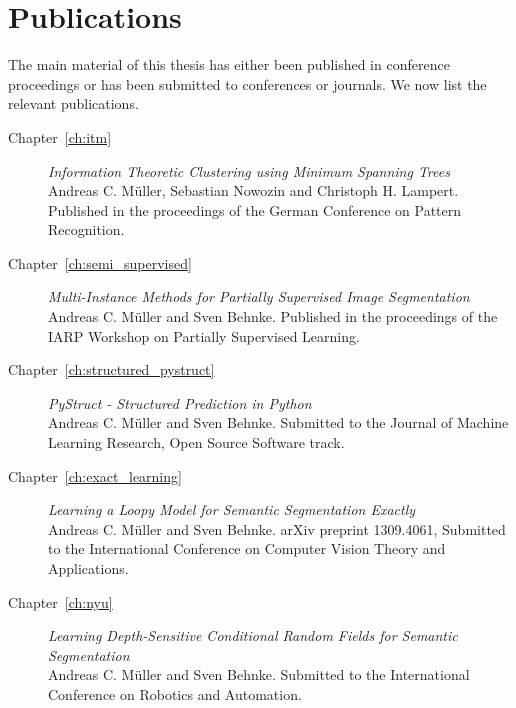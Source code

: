 \section{Publications}
The main material of this thesis has either been published in conference
proceedings or has been submitted to conferences or journals. We now list the
relevant publications.
\begin{description}
    \item[Chapter~\ref{ch:itm}]%
        \emph{Information Theoretic Clustering using Minimum Spanning Trees}\\
        Andreas C. M\"uller, Sebastian Nowozin and Christoph H. Lampert.
        Published in the proceedings of the German Conference on Pattern
        Recognition.
    \item[Chapter~\ref{ch:semi_supervised}]%
        \emph{Multi-Instance Methods for Partially Supervised Image
        Segmentation}\\
        Andreas C. M\"uller and Sven Behnke. Published in the proceedings of
        the IARP Workshop on Partially Supervised Learning.
    \item[Chapter~\ref{ch:structured_pystruct}]%
        \emph{PyStruct - Structured Prediction in Python}\\
        Andreas C. M\"uller and Sven Behnke. Submitted to the Journal of
        Machine Learning Research, Open Source Software track.
    \item[Chapter~\ref{ch:exact_learning}]%
        \emph{Learning a Loopy Model for Semantic Segmentation Exactly}\\
        Andreas C. M\"uller and Sven Behnke. arXiv preprint 1309.4061, Submitted to the International
        Conference on Computer Vision Theory and Applications.
    \item[Chapter~\ref{ch:nyu}]%
        \emph{Learning Depth-Sensitive Conditional Random Fields for Semantic Segmentation}\\
        Andreas C. M\"uller and Sven Behnke. Submitted to the International
        Conference on Robotics and Automation.
\end{description}
